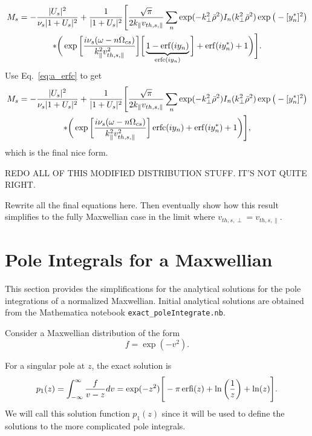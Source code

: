 \begin{multline}
	M_s = -\frac{|U_s|^2}{\nu_s|1+U_s|^2} + \frac{1}{|1+U_s|^2} 
	\Bigg[ \frac{\sqrt{\pi}}{2 k_\parallel  v_{th,s,\parallel}}
	\sum_n \exp(-k_\perp^2\bar{\rho}^2) I_n(k_\perp^2\bar{\rho}^2)\exp\big( -[y_n^*]^2\big) 	\\
	* \bigg( \exp \bigg[ \frac{i\nu_s (\omega-n\Omega_{cs})}{k_\parallel^2v_{th,s,\parallel}^2} \bigg] 
	\bigg[\underbrace{1 - \operatorname{erf}(iy_n)}_{\operatorname{erfc}(i y_n)}  \bigg] +\operatorname{erf}(iy_n^*) + 1 \bigg)
	\Bigg].
\end{multline}
Use Eq.~\ref{eq:a_erfc} to get
\begin{multline}
	M_s = -\frac{|U_s|^2}{\nu_s|1+U_s|^2} + \frac{1}{|1+U_s|^2} 
	\Bigg[ \frac{\sqrt{\pi}}{2 k_\parallel v_{th,s,\parallel}}
	\sum_n \exp(-k_\perp^2\bar{\rho}^2) I_n(k_\perp^2\bar{\rho}^2)\exp\big( -[y_n^*]^2\big) 	\\
	* \bigg( \exp \bigg[ \frac{i\nu_s (\omega-n\Omega_{cs})}{k_\parallel^2v_{th,s,\parallel}^2} \bigg] 
	\operatorname{erfc}(i y_n)+\operatorname{erf}(iy_n^*) + 1 \bigg)
	\Bigg],
\end{multline}
which is the final nice form.  

REDO ALL OF THIS MODIFIED DISTRIBUTION STUFF. IT'S NOT QUITE RIGHT.

Rewrite all the final equations here. Then eventually show how this result simplifies to the fully Maxwellian case in the limit where $v_{th,s,\perp}=v_{th,s,\parallel}$.	

\section{Pole Integrals for a Maxwellian}
\label{a:poleIntegrals_Maxwellian}
This section provides the simplifications for the analytical solutions for the pole integrations of a normalized Maxwellian.
Initial analytical solutions are obtained from the Mathematica notebook \verb*|exact_poleIntegrate.nb|.

Consider a Maxwellian distribution of the form
\begin{equation}
	f = \exp(-v^2).
	\label{eq:a_maxwellian}
\end{equation}

For a singular pole at $z$, the exact solution is
\begin{equation}
	p_1(z) = \int_{-\infty}^\infty \frac{f}{v-z} dv = 
	\exp(-z^2) \Bigg[ -\pi \operatorname{erfi}(z) + \ln\bigg(\frac{1}{z}\bigg) + \ln(z)   \Bigg].
\end{equation}
We will call this solution function $p_1(z)$ since it will be used to define the solutions to the more complicated pole integrals.

